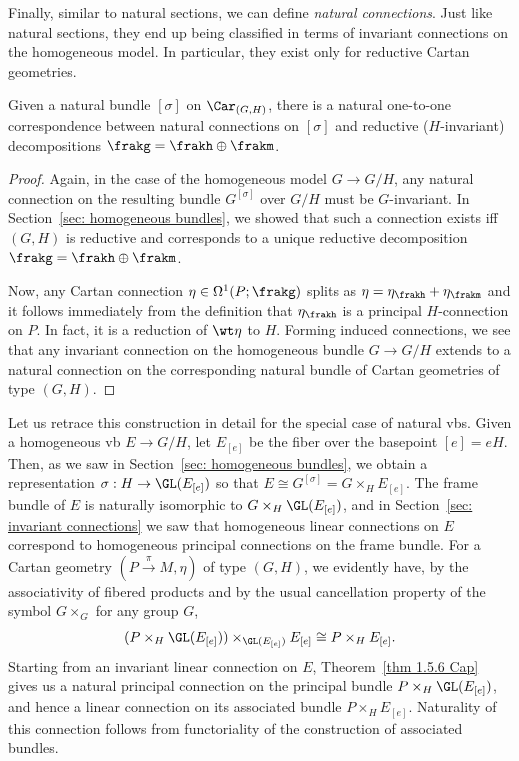 Finally, similar to natural sections, we can define \emph{natural connections}. Just like natural sections, they end up being classified in terms of invariant connections on the homogeneous model. In particular, they exist only for reductive Cartan geometries.

\begin{prop}
    Given a natural bundle $[\sigma]$ on $\Car_{(G,H)}$, there is a natural one-to-one correspondence between natural connections on $[\sigma]$ and reductive ($H$-invariant) decompositions $\frakg=\frakh\oplus\frakm$.
\end{prop}
\begin{proof}
    Again, in the case of the homogeneous model $G\to G\slash H$, any natural connection on the resulting bundle $G^{[\sigma]}$ over $G\slash H$ must be $G$-invariant. 
    In Section~\ref{sec: homogeneous bundles}, we showed that such a connection exists iff $(G,H)$ is reductive and corresponds to a unique reductive decomposition $\frakg=\frakh\oplus\frakm$.  
    
    Now, any Cartan connection $\eta\in\Omega^1(P;\frakg)$ splits as $\eta=\eta_\frakh+\eta_\frakm$ and it follows immediately from the definition that $\eta_\frakh$ is a principal $H$-connection on $P$. In fact, it is a reduction of $\wt\eta$ to $H$. Forming induced connections, we see that any invariant connection on the homogeneous bundle $G\to G\slash H$ extends to a natural connection on the corresponding natural bundle of Cartan geometries of type $(G,H)$.
\end{proof}


Let us retrace this construction in detail for the special case of natural \glspl{vb}. Given a homogeneous \gls{vb} $E\to G\slash H$, let $E_{[e]}$ be the fiber over the basepoint $[e]=eH$. Then, as we saw in Section~\ref{sec: homogeneous bundles}, we obtain a representation $\sigma:H\to \GL(E_{[e]})$ so that $E\cong G^{[\sigma]}=G\times_H E_{[e]}$. The frame bundle of $E$ is naturally isomorphic to $G\times_H \GL(E_{[e]})$, and in Section~\ref{sec: invariant connections} we saw that homogeneous linear connections on $E$ correspond to homogeneous principal connections on the frame bundle.  For a Cartan geometry $(P\overset{\pi}{\to} M,\eta)$ of type $(G,H)$, we evidently have, by the associativity of fibered products and by the usual cancellation property of the symbol $G\times_G $ for any group $G$,
\[(P\times_H\GL(E_{[e]}))\times_{\GL(E_{[e]})}E_{[e]}\cong P\times_H E_{[e]}.\]
Starting from an invariant linear connection on $E$, Theorem~\ref{thm 1.5.6 Cap} gives us a natural principal connection on the principal bundle $P\times_H \GL(E_{[e]})$, and hence a linear connection on its associated bundle $P\times_H E_{[e]}$. Naturality of this connection follows from functoriality of the construction of associated bundles.








